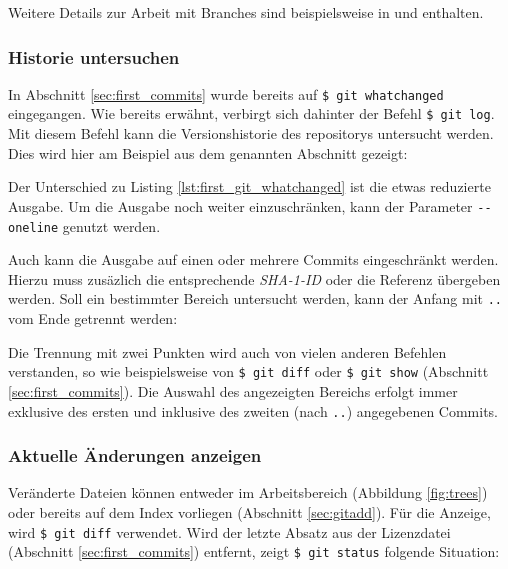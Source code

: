 Weitere Details zur Arbeit mit Branches sind beispielsweise in \cite[388-389,
408-415]{cd} und \cite[56-88]{progit} enthalten.

\subsubsection{Historie untersuchen}\label{sec:arch}
In Abschnitt \ref{sec:first_commits} wurde bereits auf \texttt{\$ git
whatchanged} eingegangen. Wie bereits erwähnt, verbirgt sich dahinter der
Befehl \texttt{\$ git log}. Mit diesem Befehl kann die Versionshistorie des
\glspl{repository} untersucht werden. Dies wird hier am Beispiel aus dem
genannten Abschnitt gezeigt:


Der Unterschied zu Listing \ref{lst:first_git_whatchanged} ist die etwas
reduzierte Ausgabe. Um die Ausgabe noch weiter einzuschränken, kann der
Parameter \texttt{-{}-{}oneline} genutzt werden.


Auch kann die Ausgabe auf einen oder mehrere Commits eingeschränkt werden.
Hierzu muss zusäzlich die entsprechende \textit{SHA-1-ID} oder die
Referenz übergeben werden. Soll ein bestimmter Bereich untersucht werden, kann
der Anfang mit \texttt{..} vom Ende getrennt werden:


Die Trennung mit zwei Punkten wird auch von vielen anderen Befehlen verstanden,
so wie beispielsweise von \texttt{\$ git diff} oder \texttt{\$ git show} (Abschnitt
\ref{sec:first_commits}). Die Auswahl des angezeigten Bereichs erfolgt immer
exklusive des ersten und inklusive des zweiten (nach \texttt{..}) angegebenen
Commits. \cite[45-48]{gitosp}

\subsubsection{Aktuelle Änderungen anzeigen}\label{sec:gitdiff}
Veränderte Dateien können entweder im Arbeitsbereich (Abbildung
\ref{fig:trees}) oder bereits auf dem Index vorliegen (Abschnitt
\ref{sec:gitadd}). Für die Anzeige, wird \texttt{\$ git diff} verwendet.
Wird der letzte Absatz aus der Lizenzdatei (Abschnitt \ref{sec:first_commits})
entfernt, zeigt \texttt{\$ git status} folgende Situation:

